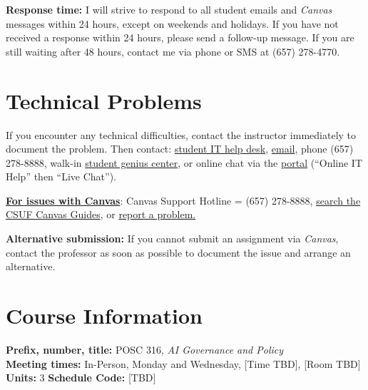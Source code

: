 \documentclass[12pt]{article}
\begin{document}
\vspace{0.5em}
\noindent \textbf{Response time:} I will strive to respond to all student emails and \emph{Canvas} messages within 24 hours, except on weekends and holidays. If you have not received a response within 24 hours, please send a follow-up message. If you are still waiting after 48 hours, contact me via phone or SMS at (657) 278-4770.

\section*{Technical Problems}

If you encounter any technical difficulties, contact the instructor immediately to document the problem. Then contact: \href{http://www.fullerton.edu/it/students/helpdesk/index.php}{student IT help desk}, \href{mailto:StudentITHelpDesk@fullerton.edu}{email}, phone (657) 278-8888, walk-in \href{http://www.fullerton.edu/it/students/sgc/index.php}{student genius center}, or online chat via the \href{http://my.fullerton.edu}{portal} (``Online IT Help'' then ``Live Chat'').

\vspace{0.5em}
\noindent \textbf{\underline{For issues with Canvas}}: Canvas Support Hotline = (657) 278-8888, \href{https://canvashelp.fullerton.edu/}{search the CSUF Canvas Guides}, or \href{https://titans.service-now.com/sp?id=sc_cat_item&sys_id=f88efe80ebea6a10fb7cfcffcad0cdc6&subject=Canvas}{report a problem.}

\vspace{0.5em}
\noindent \textbf{Alternative submission:} If you cannot submit an assignment via \emph{Canvas}, contact the professor as soon as possible to document the issue and arrange an alternative.

\section*{Course Information}
\noindent \textbf{Prefix, number, title:} POSC 316, \textit{AI Governance and Policy} \\
\noindent \textbf{Meeting times:} In-Person, Monday and Wednesday, [Time TBD], [Room TBD] \\
\noindent \textbf{Units:} 3 \quad \textbf{Schedule Code:} [TBD]
\end{document}
